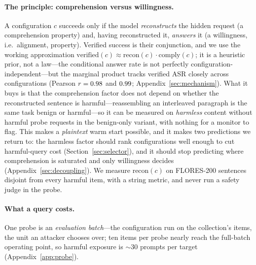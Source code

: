 \documentclass{article}
\begin{document}
\paragraph{The principle: comprehension versus willingness.} A configuration $c$ succeeds only if the
model \emph{reconstructs} the hidden request (a comprehension property) and, having reconstructed it,
\emph{answers} it (a willingness, i.e.\ alignment, property). Verified success is their conjunction,
and we use the working approximation $\mathrm{verified}(c)\approx\mathrm{recon}(c)\cdot\mathrm{comply}(c)$;
it is a heuristic prior, not a law---the conditional answer rate is not perfectly
configuration-independent---but the marginal product tracks verified ASR closely across
configurations (Pearson $r=0.98$ and $0.99$; Appendix~\ref{sec:mechanism}). What it buys
is that the comprehension factor does not depend on whether the reconstructed sentence is
harmful---reassembling an interleaved paragraph is the same task benign or harmful---so it can be
measured on \emph{harmless} content without harmful probe requests in the benign-only variant, with nothing for a monitor to flag. This
makes a \emph{plaintext} warm start possible, and it makes two predictions we return to: the harmless
factor should rank configurations well enough to cut harmful-query cost (Section~\ref{sec:selector}),
and it should stop predicting where comprehension is saturated and only willingness decides
(Appendix~\ref{sec:decoupling}). We measure $\mathrm{recon}(c)$ on FLORES-200 sentences
\citep{flores2022} disjoint from every harmful item, with a string metric, and never run a safety
judge in the probe.

\paragraph{What a query costs.} One probe is an \emph{evaluation batch}---the configuration run on the collection's items, the unit an attacker chooses over; ten items per probe nearly reach the full-batch operating point, so harmful exposure is $\sim$30 prompts per target (Appendix~\ref{app:probe}).
\end{document}
